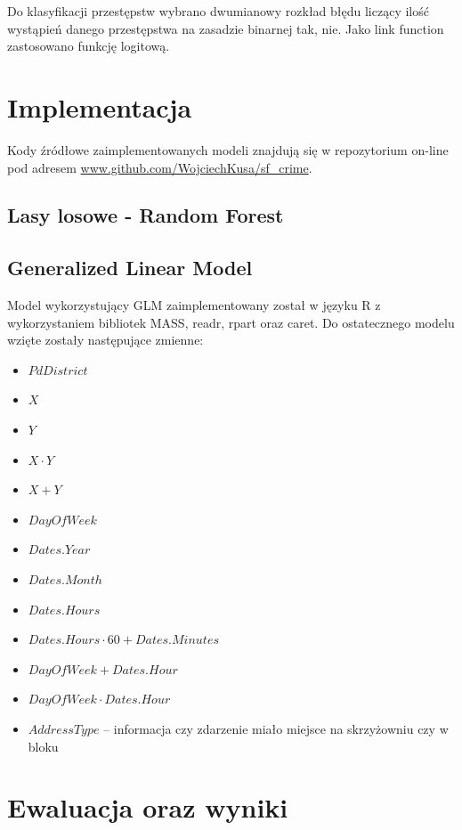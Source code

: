 \documentclass[11pt]{article} %
\begin{document}
Do klasyfikacji przestępstw wybrano dwumianowy rozkład błędu liczący ilość wystąpień danego przestępstwa na zasadzie binarnej {tak, nie}. Jako link function zastosowano funkcję logitową. \\

\section{Implementacja}

Kody źródłowe zaimplementowanych modeli znajdują się w repozytorium on-line pod adresem \url{www.github.com/WojciechKusa/sf_crime}. 

\subsection{Lasy losowe - Random Forest}

\subsection{Generalized Linear Model}

Model wykorzystujący GLM zaimplementowany został w języku R z wykorzystaniem bibliotek MASS, readr, rpart oraz caret. Do ostatecznego modelu wzięte zostały następujące zmienne:

\begin{itemize}
\item $PdDistrict$
\item $X $
\item $Y $
\item $X \cdot Y$
\item $X + Y$ 
\item $DayOfWeek$
\item $Dates.Year $
\item $Dates.Month $
\item $Dates.Hours $
\item $Dates.Hours \cdot 60 + Dates.Minutes$ 
\item $DayOfWeek + Dates.Hour $
\item $DayOfWeek \cdot Dates.Hour $
\item $AddressType $ -- informacja czy zdarzenie miało miejsce na skrzyżowniu czy w bloku

\end{itemize}


\section{Ewaluacja oraz wyniki}
\end{document}
